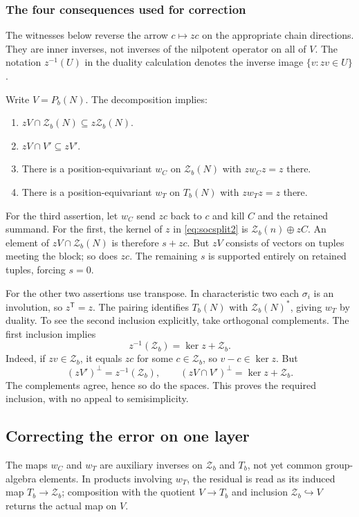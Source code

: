 \subsubsection{The four consequences used for correction}
The witnesses below reverse the arrow $c\mapsto zc$ on the appropriate
chain directions. They are inner inverses, not inverses of the
nilpotent operator on all of $V$. The notation $z^{-1}(U)$ in the
duality calculation denotes the inverse image $\{v:zv\in U\}$.

Write $V=P_b(N)$. The decomposition implies:
\begin{enumerate}
\item $zV\cap \mathcal Z_b(N)\subseteq z\mathcal Z_b(N)$.
\item $zV\cap V'\subseteq zV'$.
\item There is a position-equivariant $w_C$ on $\mathcal Z_b(N)$ with $zw_Cz=z$ there.
\item There is a position-equivariant $w_T$ on $T_b(N)$ with $zw_Tz=z$ there.
\end{enumerate}
For the third assertion, let $w_C$ send $zc$ back to $c$ and kill $C$ and the retained summand. For the first, the kernel of $z$ in \eqref{eq:socsplit2} is $\mathcal Z_b(n)\oplus zC$. An element of $zV\cap \mathcal Z_b(N)$ is therefore $s+zc$. But $zV$ consists of vectors on tuples meeting the block; so does $zc$. The remaining $s$ is supported entirely on retained tuples, forcing $s=0$.

For the other two assertions use transpose. In characteristic two each $\sigma_i$ is an involution, so $z^{\mathsf T}=z$. The pairing identifies $T_b(N)$ with $\mathcal Z_b(N)^*$, giving $w_T$ by duality. To see the second inclusion explicitly, take orthogonal complements. The first inclusion implies
\[z^{-1}(\mathcal Z_b)=\ker z+\mathcal Z_b.
\]
Indeed, if $zv\in \mathcal Z_b$, it equals $zc$ for some $c\in \mathcal Z_b$, so $v-c\in\ker z$. But
\[(zV')^\perp=z^{-1}(\mathcal Z_b),\qquad
(zV\cap V')^\perp=\ker z+\mathcal Z_b.
\]
The complements agree, hence so do the spaces. This proves the required inclusion, with no appeal to semisimplicity.

\subsection{Correcting the error on one layer}\label{sec:layerstep}
The maps $w_C$ and $w_T$ are auxiliary inverses on $\mathcal Z_b$
and $T_b$, not yet common group-algebra elements. In products involving
$w_T$, the residual is read as its induced map $T_b\to\mathcal Z_b$;
composition with the quotient $V\to T_b$ and inclusion
$\mathcal Z_b\hookrightarrow V$ returns the actual map on $V$.

